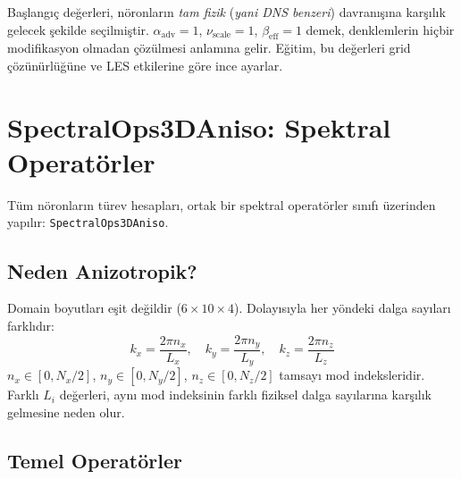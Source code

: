 \begin{remark}
Başlangıç değerleri, nöronların \textit{tam fizik} (\textit{yani DNS benzeri}) davranışına karşılık gelecek şekilde seçilmiştir. $\alpha_{\text{adv}} = 1$, $\nu_{\text{scale}} = 1$, $\beta_{\text{eff}} = 1$ demek, denklemlerin hiçbir modifikasyon olmadan çözülmesi anlamına gelir. Eğitim, bu değerleri grid çözünürlüğüne ve LES etkilerine göre ince ayarlar.
\end{remark}


\section{SpectralOps3DAniso: Spektral Operatörler}
\label{sec:spectral_ops}

Tüm nöronların türev hesapları, ortak bir spektral operatörler sınıfı üzerinden yapılır: \texttt{SpectralOps3DAniso}.

\subsection{Neden Anizotropik?}

Domain boyutları eşit değildir ($6 \times 10 \times 4$). Dolayısıyla her yöndeki dalga sayıları farklıdır:
\begin{equation}
    k_x = \frac{2\pi n_x}{L_x}, \quad
    k_y = \frac{2\pi n_y}{L_y}, \quad
    k_z = \frac{2\pi n_z}{L_z}
    \label{eq:aniso_wavenumbers}
\end{equation}
$n_x \in [0, N_x/2]$, $n_y \in [0, N_y/2]$, $n_z \in [0, N_z/2]$ tamsayı mod indeksleridir. Farklı $L_i$ değerleri, aynı mod indeksinin farklı fiziksel dalga sayılarına karşılık gelmesine neden olur.

\subsection{Temel Operatörler}

